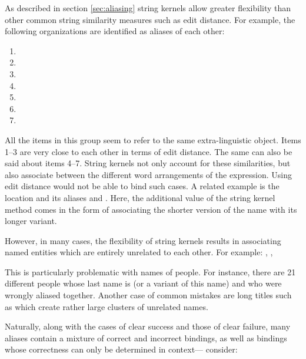 As described in section \ref{sec:aliasing} string kernels allow greater flexibility than other common string similarity measures such as edit distance.
For example, the following organizations are identified as aliases of each other:
\begin{enumerate}
\item  {}
\item  {}
\item  {}
\item  {}
\item  {}
\item  {}
\item  {}
\end{enumerate}
All the items in this group seem to refer to the same extra-linguistic object. Items 1--3 are very close to each other in terms of edit distance.
The same can also be said about items 4--7. String kernels not only account for these similarities, but also associate between the different word arrangements of the expression. Using edit distance would not be able to bind such cases. A related example is the location  and its aliases 
 and . Here, the additional value of the string kernel method comes in the form of associating the shorter version of the
name with its longer variant. 

However, in many cases, the flexibility of string kernels results in associating named entities which are entirely unrelated to each other. For example: , , 

This is particularly problematic with names of people. For instance, there are 21 different people
whose last name is  (or a variant of this name) and who were wrongly aliased
together. Another case of common mistakes are long titles such as  which create
rather large clusters of unrelated names.   
 
Naturally, along with the cases of clear success and those of clear failure, many aliases contain a mixture of correct and incorrect bindings, as well as bindings whose correctness can only be determined in context--- consider:

